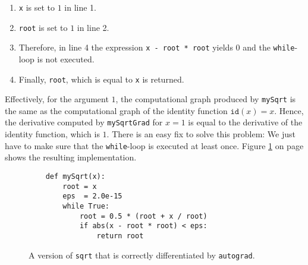 \begin{enumerate}
\item \texttt{x} is set to $1$ in line 1.
\item \texttt{root} is set to $1$ in line 2.
\item Therefore, in line 4 the expression \texttt{x - root * root} yields $0$ and the \texttt{while}-loop is
      not executed.
\item Finally, \texttt{root}, which is equal to \texttt{x} is returned.
\end{enumerate}
Effectively, for the argument $1$, the computational graph produced by \texttt{mySqrt} is the same as the
computational graph of the identity function $\mathtt{id}(x) = x$.  Hence, the derivative computed by
\texttt{mySqrtGrad} for $x=1$ is equal to the derivative of the identity function, which is $1$.   There is an
easy fix to solve this problem:  We just have to make sure that the \texttt{while}-loop is executed at least
once.  Figure \ref{fig:autograd-intro-3.ipynb} on page \pageref{fig:autograd-intro-3.ipynb} shows the resulting
implementation.

\begin{figure}[!ht]
\centering
\begin{verbatim}
    def mySqrt(x): 
        root = x
        eps  = 2.0e-15
        while True:
            root = 0.5 * (root + x / root)
            if abs(x - root * root) < eps:
                return root
\end{verbatim}
\vspace*{-0.3cm}
\caption{A version of \texttt{sqrt} that is correctly differentiated by \texttt{autograd}.}
\label{fig:autograd-intro-3.ipynb}
\end{figure}


